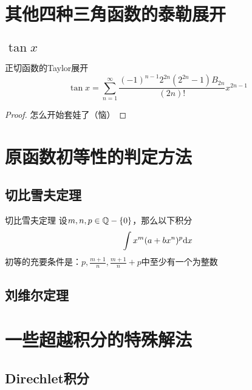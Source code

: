\documentclass[12pt, a4paper, oneside, UTF8]{ctexbook}
\begin{document}
	\section{其他四种三角函数的泰勒展开}
		\subsection{$\tan x$}
			\begin{them}{正切函数的Taylor展开}{}
				\begin{equation}
					\tan x = \sum\limits_{n=1}^{\infty} \frac{(-1)^{n-1}2^{2n}(2^{2n}-1)B_{2n}}{(2n)!}x^{2n-1}
				\end{equation}
			\end{them}
			\begin{proof}
				怎么开始套娃了（恼）
			\end{proof}
	
	\section{原函数初等性的判定方法}
		\subsection{切比雪夫定理}
			\begin{them}{切比雪夫定理}{}
				设$m,n,p\in \mathbb{Q}-\{0\}$，那么以下积分
				\begin{equation}
					\int x^m(a+bx^n)^p \mathrm{d} x
				\end{equation}
				初等的充要条件是：$p,\frac{m+1}{n},\frac{m+1}{n}+p$中至少有一个为整数
			\end{them}
		\subsection{刘维尔定理}
	
	\section{一些超越积分的特殊解法}
		\subsection{Direchlet积分}
		
	
	\ifx\allfiles\undefined
\end{document}

